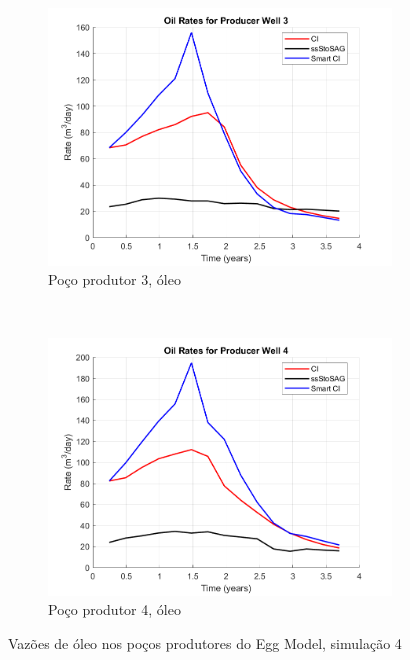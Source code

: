 \begin{figure}[!ht]
	\begin{subfigure}[b]{.3\textwidth}
		\includegraphics[width=\textwidth]{figs/resultadosEgg/imgsim4/EGG_OilWell3_Zoom}
		\caption{Po\c{c}o produtor 3, \'{o}leo}
		\label{EGG4_OilWell3}
	\end{subfigure}
	~
	\begin{subfigure}[b]{.3\textwidth}
		\includegraphics[width=\textwidth]{figs/resultadosEgg/imgsim4/EGG_OilWell4_Zoom}
		\caption{Po\c{c}o produtor 4, \'{o}leo}
		\label{EGG4_OilWell4}
	\end{subfigure}
	\caption{Vaz\~{o}es de \'{o}leo nos po\c{c}os produtores do Egg Model, simula\c{c}\~{a}o 4}
	\label{EGG4_OilRates}
\end{figure}

